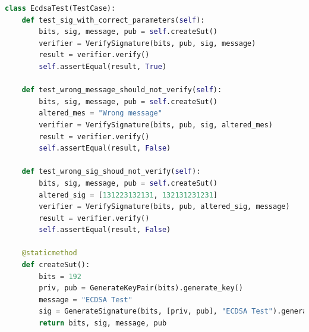 \begin{lstlisting}[language=Python]
class EcdsaTest(TestCase):
    def test_sig_with_correct_parameters(self):
        bits, sig, message, pub = self.createSut()
        verifier = VerifySignature(bits, pub, sig, message)
        result = verifier.verify()
        self.assertEqual(result, True)

    def test_wrong_message_should_not_verify(self):
        bits, sig, message, pub = self.createSut()
        altered_mes = "Wrong message"
        verifier = VerifySignature(bits, pub, sig, altered_mes)
        result = verifier.verify()
        self.assertEqual(result, False)

    def test_wrong_sig_shoud_not_verify(self):
        bits, sig, message, pub = self.createSut()
        altered_sig = [131223132131, 132131231231]
        verifier = VerifySignature(bits, pub, altered_sig, message)
        result = verifier.verify()
        self.assertEqual(result, False)

    @staticmethod
    def createSut():
        bits = 192
        priv, pub = GenerateKeyPair(bits).generate_key()
        message = "ECDSA Test"
        sig = GenerateSignature(bits, [priv, pub], "ECDSA Test").generate_signature()
        return bits, sig, message, pub
\end{lstlisting}


